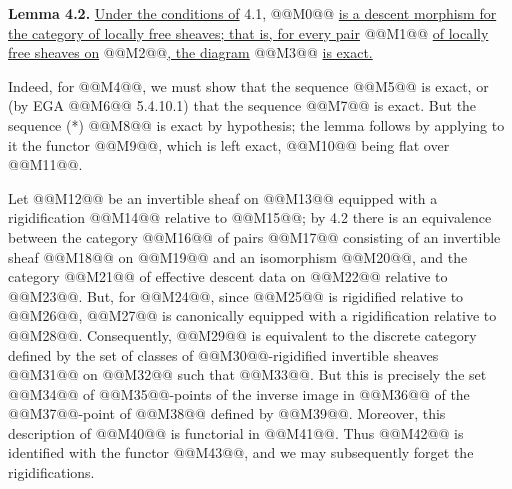 \textbf{Lemma 4.2.} \uline{Under the conditions of} 4.1, @@M0@@ \uline{is a descent morphism for the category of locally free sheaves; that is, for every pair} @@M1@@ \uline{of locally free sheaves on} @@M2@@\uline{, the diagram}
@@M3@@
\uline{is exact.}

Indeed, for @@M4@@, we must show that the sequence
@@M5@@
is exact, or (by EGA @@M6@@ 5.4.10.1) that the sequence
@@M7@@
is exact. But the sequence (*) @@M8@@ is exact by hypothesis; the lemma follows by applying to it the functor @@M9@@, which is left exact, @@M10@@ being flat over @@M11@@.

Let @@M12@@ be an invertible sheaf on @@M13@@ equipped with a rigidification @@M14@@ relative to @@M15@@; by 4.2 there is an equivalence between the category @@M16@@ of pairs @@M17@@ consisting of an invertible sheaf @@M18@@ on @@M19@@ and an isomorphism @@M20@@, and the category @@M21@@ of effective descent data on @@M22@@ relative to @@M23@@. But, for @@M24@@, since @@M25@@ is rigidified relative to @@M26@@, @@M27@@ is canonically equipped with a rigidification relative to @@M28@@. Consequently, @@M29@@ is equivalent to the discrete category defined by the set of classes of @@M30@@-rigidified invertible sheaves @@M31@@ on @@M32@@ such that @@M33@@. But this is precisely the set @@M34@@ of @@M35@@-points of the inverse image in @@M36@@ of the @@M37@@-point of @@M38@@ defined by @@M39@@. Moreover, this description of @@M40@@ is functorial in @@M41@@. Thus @@M42@@ is identified with the functor @@M43@@, and we may subsequently forget the rigidifications.


